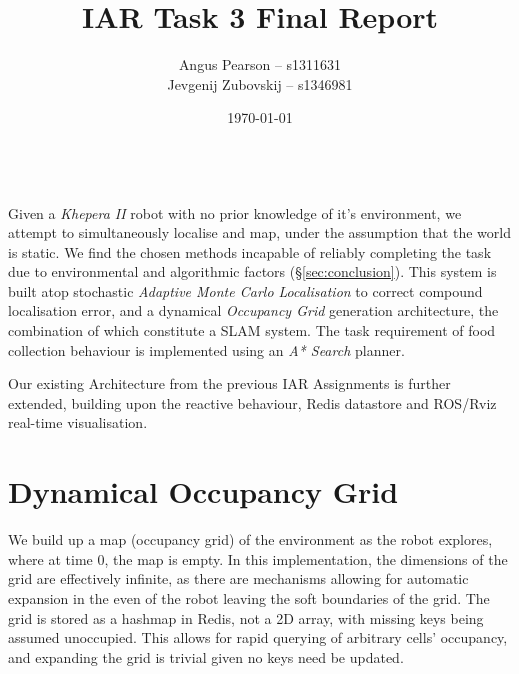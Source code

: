\documentclass[11pt, a4paper]{article}
\renewenvironment{abstract}{%
{\mdseries\scshape\Large\abstractname}
\vspace{1em}\\
}{\par\noindent}
\begin{document}
\title{IAR Task 3 Final Report}
\author{Angus Pearson -- s1311631\\ Jevgenij Zubovskij -- s1346981}
\date{\today}
\maketitle



\begin{abstract}
Given a \textit{Khepera II} robot with no prior knowledge of it's environment, we attempt to 
simultaneously localise and map, under the assumption that the world is static. We find the chosen
methods incapable of reliably completing the task due to environmental and algorithmic factors 
(\S\ref{sec:conclusion}).
This system is built atop stochastic \textit{Adaptive Monte Carlo Localisation} \cite{principlesrobot} 
to correct compound localisation error, and a dynamical \textit{Occupancy Grid} generation architecture, 
the combination of which constitute a SLAM system. The task requirement of food collection
behaviour is implemented using an \textit{A* Search} planner.

Our existing Architecture from the previous IAR Assignments \cite{task1_report}\cite{task2_report} 
is further extended, building upon the reactive behaviour, Redis datastore and ROS/Rviz real-time 
visualisation.

\end{abstract}




\section{Dynamical Occupancy Grid}

We build up a map (occupancy grid) of the environment as the robot explores, where at time $0$, the map
is empty. In this implementation, the dimensions of the grid are effectively infinite, as there are
mechanisms allowing for automatic expansion in the even of the robot leaving the soft boundaries of
the grid. The grid is stored as a hashmap in Redis, not a 2D array, with missing keys being assumed 
unoccupied. This allows for rapid querying of arbitrary cells' occupancy, and expanding the grid
is trivial given no keys need be updated.
\end{document}
